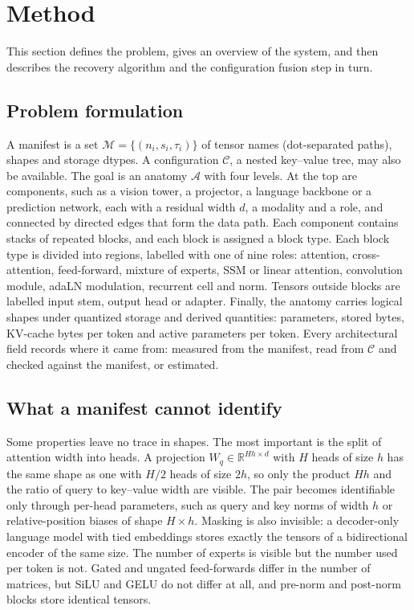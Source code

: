 \documentclass[11pt]{article}
\begin{document}
\section{Method}
\label{sec:method}

This section defines the problem, gives an overview of the system, and then describes the recovery algorithm and the configuration fusion step in turn.

\subsection{Problem formulation}
\label{sec:problem}

A manifest is a set $\mathcal{M}=\{(n_i, s_i, \tau_i)\}$ of tensor names (dot-separated paths), shapes and storage dtypes. A configuration $\mathcal{C}$, a nested key--value tree, may also be available. The goal is an anatomy $\mathcal{A}$ with four levels. At the top are components, such as a vision tower, a projector, a language backbone or a prediction network, each with a residual width $d$, a modality and a role, and connected by directed edges that form the data path. Each component contains stacks of repeated blocks, and each block is assigned a block type. Each block type is divided into regions, labelled with one of nine roles: attention, cross-attention, feed-forward, mixture of experts, SSM or linear attention, convolution module, adaLN modulation, recurrent cell and norm. Tensors outside blocks are labelled input stem, output head or adapter. Finally, the anatomy carries logical shapes under quantized storage and derived quantities: parameters, stored bytes, KV-cache bytes per token and active parameters per token. Every architectural field records where it came from: measured from the manifest, read from $\mathcal{C}$ and checked against the manifest, or estimated.

\subsection{What a manifest cannot identify}
\label{sec:ident}
Some properties leave no trace in shapes. The most important is the split of attention width into heads. A projection $W_q\in\mathbb{R}^{Hh\times d}$ with $H$ heads of size $h$ has the same shape as one with $H/2$ heads of size $2h$, so only the product $Hh$ and the ratio of query to key--value width are visible. The pair becomes identifiable only through per-head parameters, such as query and key norms of width $h$ or relative-position biases of shape $H\times h$. Masking is also invisible: a decoder-only language model with tied embeddings stores exactly the tensors of a bidirectional encoder of the same size. The number of experts is visible but the number used per token is not. Gated and ungated feed-forwards differ in the number of matrices, but SiLU and GELU do not differ at all, and pre-norm and post-norm blocks store identical tensors.
\end{document}
